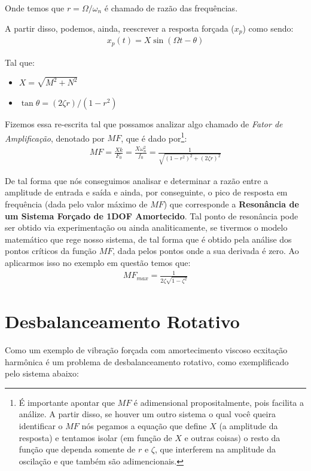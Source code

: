 \documentclass{article}
\begin{document}
            Onde temos que $r = \Omega / \omega_n$ é chamado de razão das frequências.

            A partir disso, podemos, ainda, reescrever a resposta forçada ($x_p$) como sendo:
            \begin{align}
                x_p(t) = X\sin(\Omega t - \theta)
            \end{align}

            Tal que:
            \begin{itemize}
                \item $X = \sqrt{M^2 + N^2}$
                \item $\tan{\theta} = (2\zeta r)/(1-r^2)$
            \end{itemize}

            Fizemos essa re-escrita tal que possamos analizar algo chamado de \emph{Fator de Amplificação}, denotado por \textbf{$MF$}, que é dado por\footnote{É importante apontar que $MF$ é
            adimensional propositalmente, pois facilita a análize. A partir disso, se houver um outro sistema o qual você queira identificar o $MF$ nós pegamos a equação que define $X$ (a amplitude da
            resposta) e tentamos isolar (em função de $X$ e outras coisas) o resto da função que dependa somente de $r$ e $\zeta$, que interferem na amplitude da oscilação e que também são adimencionais.}:
            \begin{align}
                MF = \frac{Xk}{F_0} = \frac{X\omega_n^2}{f_0} = \frac{1}{\sqrt{(1 - r^2)^2 + (2\zeta r)^2}}\label{eq:fator_de_amplificacao}
            \end{align}

            De tal forma que nós conseguimos analisar e determinar a razão entre a amplitude de entrada e saída e ainda, por conseguinte, o pico de resposta em frequência (dada pelo valor máximo de $MF$) que corresponde a \textbf{Resonância de um Sistema Forçado de 1DOF
            Amortecido}. Tal ponto de resonância pode ser obtido via experimentação ou ainda analiticamente, se tivermos o modelo matemático que rege nosso sistema, de tal forma que é obtido pela análise
            dos pontos críticos da função $MF$, dada pelos pontos onde a sua derivada é zero. Ao aplicarmos isso no exemplo em questão temos que:
            \begin{align}
                MF_{max} = \frac{1}{2\zeta\sqrt{1-\zeta^2}}
            \end{align}

        \section{Desbalanceamento Rotativo}
            Como um exemplo de vibração forçada com amortecimento viscoso ecxitação harmônica  é um problema de desbalanceamento rotativo, como exemplificado pelo sistema abaixo:
\end{document}
